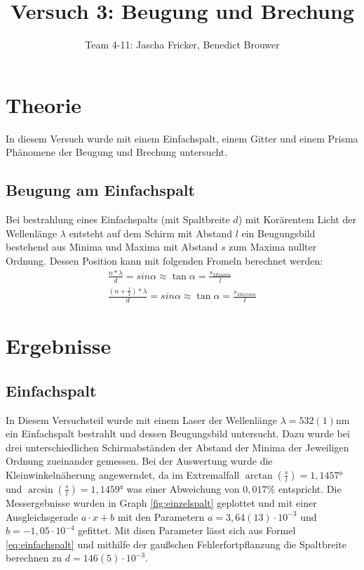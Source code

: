 \documentclass[11pt, a4paper]{article}
\title{Versuch 3: Beugung und Brechung}
\author{Team 4-11: Jascha Fricker, Benedict Brouwer}
\begin{document}
    \maketitle

    \tableofcontents

    \newpage

    \section{Theorie}
    \FloatBarrier
    In diesem Versuch wurde mit einem Einfachspalt, einem Gitter und einem Prisma Phänomene der Beugung und Brechung untersucht. 

    \subsection{Beugung am Einfachspalt}
    Bei bestrahlung eines Einfachspalts (mit Spaltbreite $d$) mit Korärentem Licht der Wellenlänge $\lambda$ entsteht auf dem Schirm mit Abstand $l$ ein Beugungsbild bestehend aus Minima und Maxima mit Abstand $s$ zum Maxima nullter Ordnung. Dessen Position kann mit folgenden Fromeln berechnet werden:
    \begin{align}
        \frac{n * \lambda}{d} = sin{\alpha} \approx \tan{\alpha} = \frac{s_{Minima}}{l} \label{eq:einfachspalt} \\
        \frac{(n + \frac{1}{2})* \lambda}{d} = sin{\alpha} \approx \tan{\alpha} = \frac{s_{Maxima}}{l} 
    \end{align}

    \section{Ergebnisse}
    \subsection{Einfachspalt}
    In Diesem Versuchsteil wurde mit einem Laser der Wellenlänge $\lambda = 532(1)\si{\nano\meter}$ ein Einfachspalt bestrahlt und dessen Beugungsbild untersucht.
    Dazu wurde bei drei unterschiedlichen Schirmabständen der Abstand der Minima der Jeweiligen Ordnung zueinander gemessen. Bei der Auswertung wurde die Kleinwinkelnäherung angewerndet, da im Extremalfall $\arctan(\frac{s}{l}) = 1,1457°$ und $\arcsin(\frac{s}{l}) = 1,1459°$
    was einer Abweichung von $0,017\percent$ entspricht. Die Messergebnisse wurden in Graph \ref{fig:einzelspalt} geplottet und mit einer Ausgleichsgerade $a \cdot x + b$ mit den Parametern $a = 3,64(13) \cdot 10^{-3}$ und $b= -1,05 \cdot 10^{-4}$ gefittet.
    Mit disen Parameter lässt sich aus Formel \ref{eq:einfachspalt} und mithilfe der gaußschen Fehlerfortpflanzung die Spaltbreite berechnen zu $d= 146(5) \cdot 10^{-3}$.
    
\end{document}

